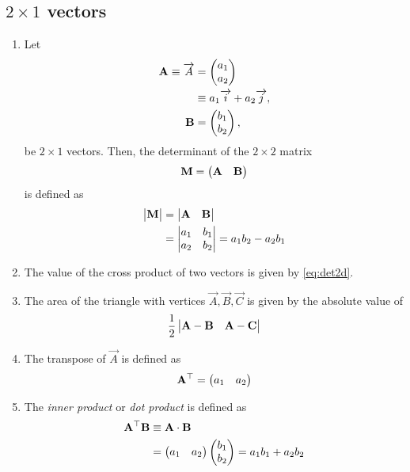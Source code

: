 \documentclass[journal,12pt,onecolumn]{IEEEtran}
\renewcommand\thesection{\arabic{section}}
\renewcommand\thesubsection{\thesection.\arabic{subsection}}
\begin{document}
\subsection{$2\times 1$ vectors}
\renewcommand{\theequation}{\theenumi}
\begin{enumerate}[label=\thesubsection.\arabic*.,ref=\thesubsection.\theenumi]
\item Let 
\begin{align}
  \mathbf{A} \equiv \overrightarrow{A} &= \begin{pmatrix}a_1\\a_2\end{pmatrix} 
  \\
  &\equiv a_1\overrightarrow{i}+a_2\overrightarrow{j}, 
  \\
  \mathbf{B} &= \begin{pmatrix}b_1\\b_2\end{pmatrix}, 
\end{align}
be $2 \times 1$ vectors.
Then, the determinant of the $2 \times 2$ matrix 
\begin{align}  
  \mathbf{M} = \begin{pmatrix}\mathbf{A} & \mathbf{B}\end{pmatrix}
\end{align}
is defined as
\begin{align}
  \label{eq:det2d}
  \begin{vmatrix}\mathbf{M}\end{vmatrix} &= \begin{vmatrix}\mathbf{A} & \mathbf{B}\end{vmatrix} 
  \\
  &= \begin{vmatrix}a_1 & b_1\\a_2 & b_2\end{vmatrix} = a_1b_2 - a_2 b_1
\end{align}
%
\item The value of the cross product of two vectors is given by  
  \eqref{eq:det2d}.
\item The area of the triangle with vertices $\vec{A}, \vec{B}, \vec{C}$ is given by the absolute value of 
\begin{align}
  \label{eq:area2d}
\frac{1}{2} \begin{vmatrix}\mathbf{A-B} & \mathbf{A-C}\end{vmatrix}
  \end{align}
  \item  The transpose of $\vec{A}$ is defined as
\begin{align}
  \label{eq:transpose2d}
  \mathbf{A}^{\top}  = \begin{pmatrix}a_1 & a_2\end{pmatrix}
\end{align}
%
\item The {\em inner product} or {\em dot product} is defined as
\begin{align}
  \label{eq:dot2d}
  \mathbf{A}^{\top} \mathbf{B} &\equiv \mathbf{A} \cdot \mathbf{B} 
  \\
  &= \begin{pmatrix}a_1 & a_2\end{pmatrix} \begin{pmatrix}b_1 \\ b_2\end{pmatrix}= a_1b_1+a_2b_2 
\end{align}

\end{enumerate}
\end{document}
